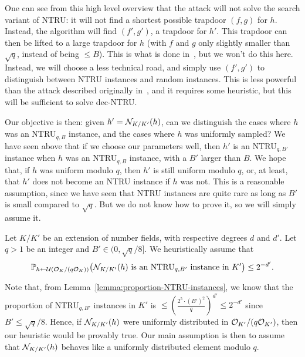 One can see from this high level overview that the attack will not solve the search variant of NTRU: it will not find a shortest possible trapdoor $(f,g)$ for $h$. Instead, the algorithm will find $(f', g')$, a trapdoor for $h'$. This trapdoor can then be lifted to a large trapdoor for $h$ (with $f$ and $g$ only slightly smaller than $\sqrt{q}$, instead of being $\leq B$). This is what is done in~\cite{ABD16}, but we won't do this here. Instead, we will choose a less technical road, and simply use $(f',g')$ to distinguish between NTRU instances and random instances. This is less powerful than the attack described originally in~\cite{ABD16}, and it requires some heuristic, but this will be sufficient to solve dec-NTRU.

Our objective is then: given $h' = \mathcal{N}_{K/K'}(h)$, can we distinguish the cases where $h$ was an NTRU$_{q,B}$ instance, and the cases where $h$ was uniformly sampled? We have seen above that if we choose our parameters well, then $h'$ is an NTRU$_{q,B'}$ instance when $h$ was an NTRU$_{q,B}$ instance, with a $B'$ larger than $B$. We hope that, if $h$ was uniform modulo $q$, then $h'$ is still uniform modulo $q$, or, at least, that $h'$ does not become an NTRU instance if $h$ was not. This is a reasonable assumption, since we have seen that NTRU instances are quite rare as long as $B'$ is small compared to $\sqrt{q}$. But we do not know how to prove it, so we will simply assume it.

\begin{heuristic}
\label{heuristic:NTRU}
Let $K/K'$ be an extension of number fields, with respective degrees $d$ and $d'$.
Let $q > 1$ be an integer and $B' \in (0,\sqrt{q}/8]$. We heuristically assume that
\[{\mathbb{P}}_{h \leftarrow \mathcal{U}(\mathcal{O}_K/(q\mathcal{O}_K))}\big( \mathcal{N}_{K/K'}(h) \text{ is an NTRU$_{q,B'}$ instance in $K'$}\big) \leq 2^{-d'}.\]
\end{heuristic}

Note that, from Lemma~\ref{lemma:proportion-NTRU-instances}, we know that the proportion of NTRU$_{q,B'}$ instances in $K'$ is $\leq \left( \frac{2^5 \cdot (B')^2}{q}\right)^{d'} \leq 2^{-d'}$ since $B' \leq \sqrt{q}/8$. Hence, if $\mathcal{N}_{K/K'}(h)$ were uniformly distributed in $\mathcal{O}_{K'}/(q\mathcal{O}_{K'})$, then our heuristic would be provably true. Our main assumption is then to assume that $\mathcal{N}_{K/K'}(h)$ behaves like a uniformly distributed element modulo $q$.


